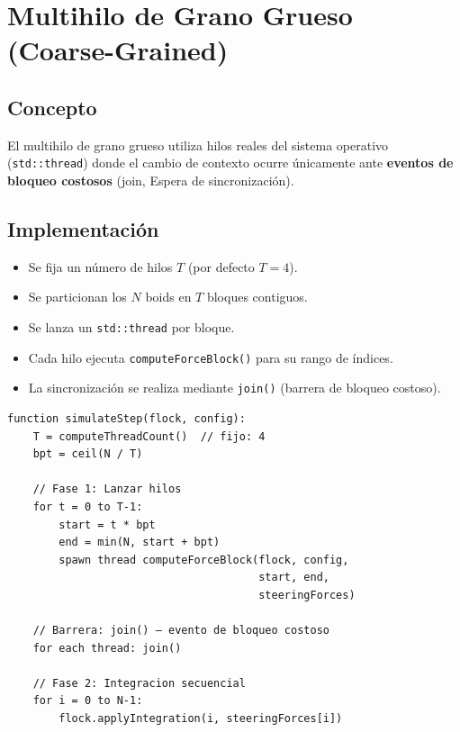 \documentclass[11pt,a4paper]{article}
\begin{document}
\section{Multihilo de Grano Grueso (Coarse-Grained)}
\label{sec:grano-grueso}

\subsection{Concepto}

El multihilo de grano grueso utiliza hilos reales del sistema operativo (\texttt{std::thread}) donde el cambio de contexto ocurre únicamente ante \textbf{eventos de bloqueo costosos} (join, Espera de sincronización).

\subsection{Implementación}

\begin{itemize}
  \item Se fija un número de hilos $T$ (por defecto $T = 4$).
  \item Se particionan los $N$ boids en $T$ bloques contiguos.
  \item Se lanza un \texttt{std::thread} por bloque.
  \item Cada hilo ejecuta \texttt{computeForceBlock()} para su rango de índices.
  \item La sincronización se realiza mediante \texttt{join()} (barrera de bloqueo costoso).
\end{itemize}

\begin{tcolorbox}[title=Pseudocódigo — Coarse-Grained]
\begin{lstlisting}[language={},basicstyle=\ttfamily\small,numbers=none]
function simulateStep(flock, config):
    T = computeThreadCount()  // fijo: 4
    bpt = ceil(N / T)
    
    // Fase 1: Lanzar hilos
    for t = 0 to T-1:
        start = t * bpt
        end = min(N, start + bpt)
        spawn thread computeForceBlock(flock, config,
                                       start, end,
                                       steeringForces)
    
    // Barrera: join() — evento de bloqueo costoso
    for each thread: join()
    
    // Fase 2: Integracion secuencial
    for i = 0 to N-1:
        flock.applyIntegration(i, steeringForces[i])
\end{lstlisting}
\end{tcolorbox}
\end{document}
